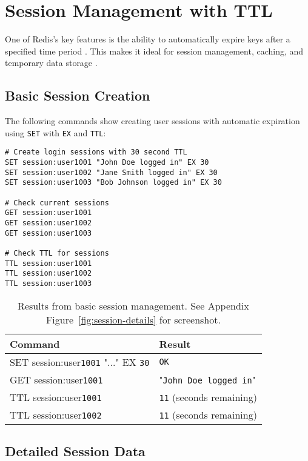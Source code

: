 \section{Session Management with TTL}

One of Redis's key features is the ability to automatically expire keys after a specified time period \parencite{redis_ttl}. This makes it ideal for session management, caching, and temporary data storage \parencite{redis_documentation}.

\subsection{Basic Session Creation}

The following commands show creating user sessions with automatic expiration using \texttt{SET} with \texttt{EX} and \texttt{TTL}:

\begin{verbatim}
# Create login sessions with 30 second TTL
SET session:user1001 "John Doe logged in" EX 30
SET session:user1002 "Jane Smith logged in" EX 30
SET session:user1003 "Bob Johnson logged in" EX 30

# Check current sessions
GET session:user1001
GET session:user1002
GET session:user1003

# Check TTL for sessions
TTL session:user1001
TTL session:user1002
TTL session:user1003
\end{verbatim}

\begin{table}[H]
  \centering
  \begin{tabular}{|l|l|}
    \hline
    \textbf{Command} & \textbf{Result} \\
    \hline
    SET session:user\texttt{1001} "..." EX \texttt{30} & \texttt{OK} \\
    GET session:user\texttt{1001} & "\texttt{John Doe logged in}" \\
    TTL session:user\texttt{1001} & \texttt{11} (seconds remaining) \\
    TTL session:user\texttt{1002} & \texttt{11} (seconds remaining) \\
    \hline
  \end{tabular}
  \caption{Results from basic session management. See Appendix Figure~\ref{fig:session-details} for screenshot.}
\end{table}

\subsection{Detailed Session Data}

